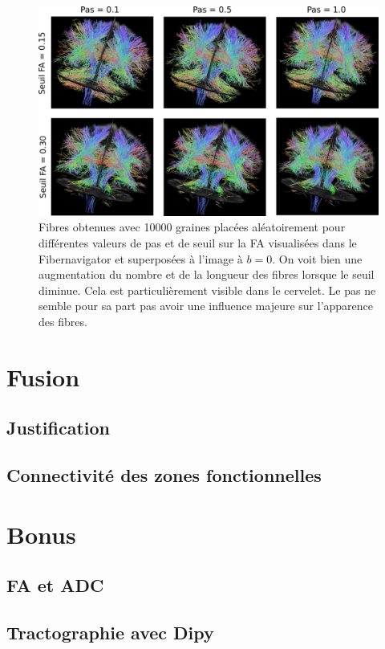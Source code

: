 \documentclass[a4paper]{article}
\begin{document}
\begin{figure}
\begin{center}
\includegraphics[scale=.3]{tracking}
\caption{Fibres obtenues avec 10000 graines placées aléatoirement pour différentes valeurs de pas et de seuil sur la FA visualisées dans le Fibernavigator et superposées à l'image à $b=0$. On voit bien une augmentation du nombre et de la longueur des fibres lorsque le seuil diminue. Cela est particulièrement visible dans le cervelet. Le pas ne semble pour sa part pas avoir une influence majeure sur l'apparence des fibres. \label{tracking}}
\end{center}
\end{figure}

\section{Fusion}

\subsection{Justification}

\subsection{Connectivité des zones fonctionnelles}

\section{Bonus}

\subsection{FA et ADC}

\subsection{Tractographie avec Dipy}
\end{document}
